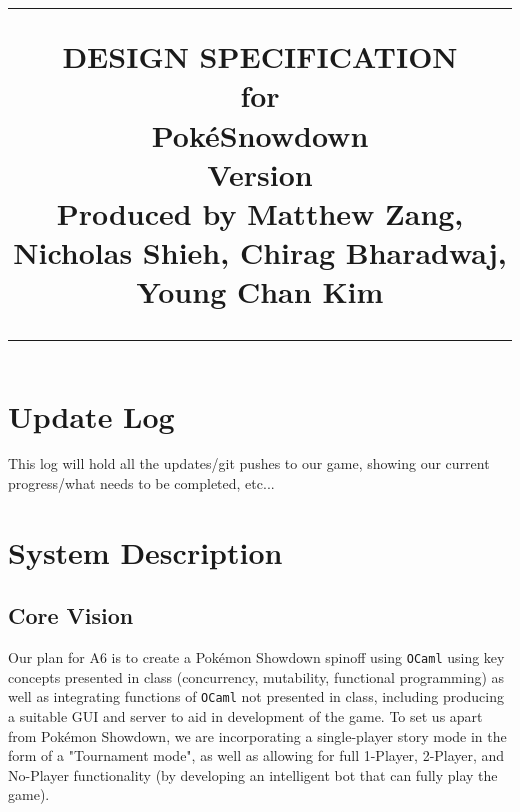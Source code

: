 \documentclass{scrreprt}
\title{%
\flushleft
\rule{16cm}{5pt}\vskip1cm
\Huge{DESIGN SPECIFICATION}\\
for\\
Pok\'eSnowdown \\
\vspace{2cm}
\LARGE{Version \myversion\\}
\vspace{2cm}
Produced by Matthew Zang, Nicholas Shieh, Chirag Bharadwaj, Young Chan Kim\\
\vfill
\rule{16cm}{5pt}
}
\date{}
\begin{document}
\maketitle
\tableofcontents
\restoregeometry
\section{Update Log}

This log will hold all the updates/git pushes to our game, showing our current progress/what needs to be completed, etc...

\pagebreak 
\section{System Description}
\subsection{Core Vision}

Our plan for A6 is to create a Pok\'emon Showdown spinoff using \texttt{OCaml} using key concepts presented in class (concurrency, mutability, functional programming) as well as integrating functions of \texttt{OCaml} not presented in class, including producing a suitable GUI and server to aid in development of the game. To set us apart from Pok\'emon Showdown, we are incorporating a single-player story mode in the form of a "Tournament mode", as well as allowing for full 1-Player, 2-Player, and No-Player functionality (by developing an intelligent bot that can fully play the game).
\end{document}
